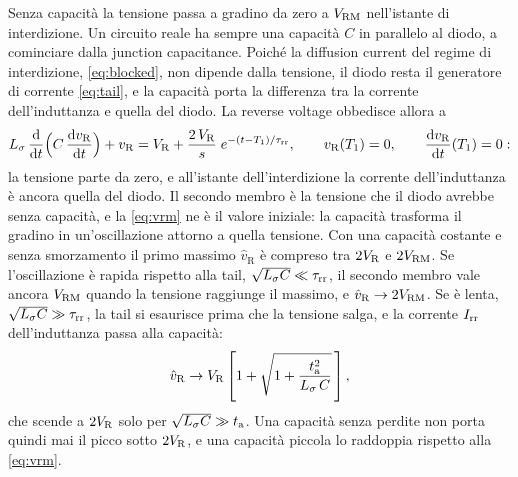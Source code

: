 \documentclass[10pt,a4paper]{scrartcl}
\let\newcommand\pdvaluedefine
\newcommand{\VR}{V_\mathrm{R}}
\newcommand{\Irr}{I_\mathrm{rr}}
\newcommand{\ta}{t_\mathrm{a}}
\newcommand{\taurr}{\tau_\mathrm{rr}}
\newcommand{\Tone}{T_1}
\newcommand{\Vrm}{V_\mathrm{RM}}
\newcommand{\diff}{\mathrm{d}}
\newcommand{\Ls}{L_\sigma}                    %
\begin{document}
Senza capacità la tensione passa a gradino da zero a $\Vrm$ nell'istante di interdizione. Un circuito reale ha sempre una capacità $C$ in parallelo al diodo, a cominciare dalla junction capacitance. Poiché la diffusion current del regime di interdizione, \eqref{eq:blocked}, non dipende dalla tensione, il diodo resta il generatore di corrente \eqref{eq:tail}, e la capacità porta la differenza tra la corrente dell'induttanza e quella del diodo. La reverse voltage obbedisce allora a
\begin{equation}
\Ls\,\frac{\diff}{\diff t}\Bigl(C\,\frac{\diff v_\mathrm{R}}{\diff t}\Bigr) + v_\mathrm{R} = \VR + \frac{2\,\VR}{s}\;e^{-(t-\Tone)/\taurr} , \qquad v_\mathrm{R}(\Tone) = 0 , \qquad \frac{\diff v_\mathrm{R}}{\diff t}(\Tone) = 0 :
\label{eq:vlc}
\end{equation}
la tensione parte da zero, e all'istante dell'interdizione la corrente dell'induttanza è ancora quella del diodo. Il secondo membro è la tensione che il diodo avrebbe senza capacità, e la \eqref{eq:vrm} ne è il valore iniziale: la capacità trasforma il gradino in un'oscillazione attorno a quella tensione. Con una capacità costante e senza smorzamento il primo massimo $\hat v_\mathrm{R}$ è compreso tra $2\VR$ e $2\Vrm$. Se l'oscillazione è rapida rispetto alla tail, $\sqrt{\Ls C} \ll \taurr$, il secondo membro vale ancora $\Vrm$ quando la tensione raggiunge il massimo, e $\hat v_\mathrm{R} \to 2\Vrm$. Se è lenta, $\sqrt{\Ls C} \gg \taurr$, la tail si esaurisce prima che la tensione salga, e la corrente $\Irr$ dell'induttanza passa alla capacità:
\begin{equation}
\hat v_\mathrm{R} \to \VR\left[1 + \sqrt{1 + \frac{\ta^2}{\Ls\,C}}\,\right] ,
\label{eq:vpkslow}
\end{equation}
che scende a $2\VR$ solo per $\sqrt{\Ls C} \gg \ta$. Una capacità senza perdite non porta quindi mai il picco sotto $2\VR$, e una capacità piccola lo raddoppia rispetto alla \eqref{eq:vrm}.
\end{document}
